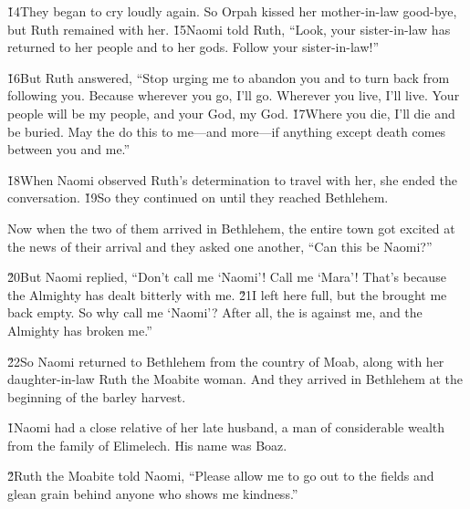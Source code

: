 \v{14}They began to cry loudly again. So Orpah kissed her mother-in-law good-bye, but Ruth remained with her. \v{15}Naomi told Ruth, ``Look, your sister-in-law has returned to her people and to her gods. Follow your sister-in-law!''

\v{16}But Ruth answered, ``Stop urging me to abandon you and to turn back from following you. Because wherever you go, I'll go. Wherever you live, I'll live. Your people will be my people, and your God, my God. \v{17}Where you die, I'll die and be buried. May the  do this to me---and more---if anything except death comes between you and me.''

\v{18}When Naomi observed Ruth's determination to travel with her, she ended the conversation. \v{19}So they continued on until they reached Bethlehem.

Now when the two of them arrived in Bethlehem, the entire town got excited at the news of their arrival and they asked one another, ``Can this be Naomi?''

\v{20}But Naomi replied, ``Don't call me `Naomi'! Call me `Mara'! That's because the Almighty has dealt bitterly with me. \v{21}I left here full, but the  brought me back empty. So why call me `Naomi'? After all, the  is against me, and the Almighty has broken me.''

\v{22}So Naomi returned to Bethlehem from the country of Moab, along with her daughter-in-law Ruth the Moabite woman. And they arrived in Bethlehem at the beginning of the barley harvest.

\v{1}Naomi had a close relative of her late husband, a man of considerable wealth from the family of Elimelech. His name was Boaz.

\v{2}Ruth the Moabite told Naomi, ``Please allow me to go out to the fields and glean grain behind anyone who shows me kindness.''

